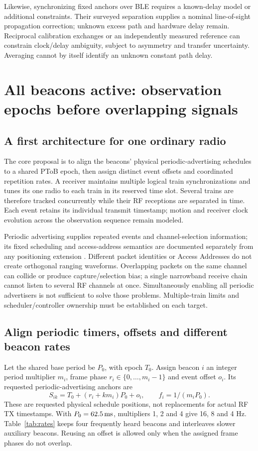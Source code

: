 \documentclass[11pt,letterpaper]{article}
\begin{document}
Likewise, synchronizing fixed anchors over BLE requires a known-delay model or additional constraints. Their surveyed separation supplies a nominal line-of-sight propagation correction; unknown excess path and hardware delay remain. Reciprocal calibration exchanges or an independently measured reference can constrain clock/delay ambiguity, subject to asymmetry and transfer uncertainty. Averaging cannot by itself identify an unknown constant path delay.

\section{All beacons active: observation epochs before overlapping signals}\label{sec:multiple}
\subsection{A first architecture for one ordinary radio}
The core proposal is to align the beacons' physical periodic-advertising schedules to a shared PToB epoch, then assign distinct event offsets and coordinated repetition rates. A receiver maintains multiple logical train synchronizations and tunes its one radio to each train in its reserved time slot. Several trains are therefore tracked concurrently while their RF receptions are separated in time. Each event retains its individual transmit timestamp; motion and receiver clock evolution across the observation sequence remain modeled.

Periodic advertising supplies repeated events and channel-selection information; its fixed scheduling and access-address semantics are documented separately from any positioning extension \cite{blecore,silabs}. Different packet identities or Access Addresses do not create orthogonal ranging waveforms. Overlapping packets on the same channel can collide or produce capture/selection bias; a single narrowband receive chain cannot listen to several RF channels at once. Simultaneously enabling all periodic advertisers is not sufficient to solve those problems. Multiple-train limits and scheduler/controller ownership must be established on each target.

\subsection{Align periodic timers, offsets and different beacon rates}\label{sec:multirate}
Let the shared base period be $P_0$, with epoch $T_0$. Assign beacon $i$ an integer period multiplier $m_i$, frame phase $r_i\in\{0,\ldots,m_i-1\}$ and event offset $o_i$. Its requested periodic-advertising anchors are
\begin{equation}
 S_{ik}=T_0+(r_i+k m_i)P_0+o_i,\qquad f_i=1/(m_iP_0).\label{eq:schedule}
\end{equation}
These are requested physical schedule positions, not replacements for actual RF TX timestamps. With $P_0=62.5\,\mathrm{ms}$, multipliers 1, 2 and 4 give 16, 8 and 4 Hz. Table~\ref{tab:rates} keeps four frequently heard beacons and interleaves slower auxiliary beacons. Reusing an offset is allowed only when the assigned frame phases do not overlap.
\end{document}
